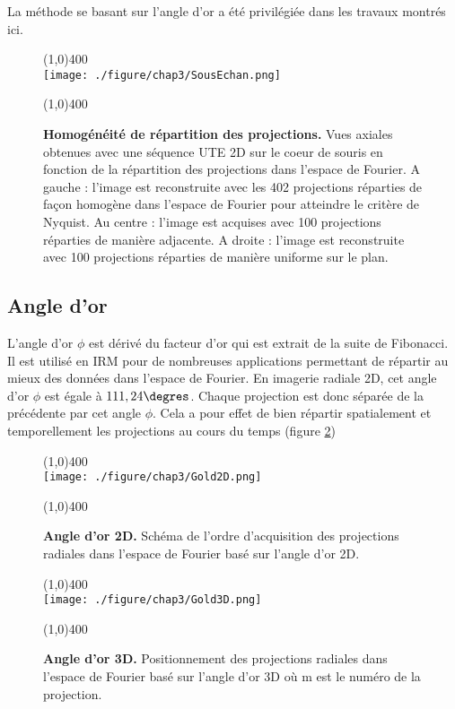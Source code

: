 La méthode se basant sur l’angle d’or a été privilégiée dans les travaux montrés ici.

\begin{figure}[H]
\centering
\line(1,0){400} \\
\texttt{[image: ./figure/chap3/SousEchan.png]}
\caption[Homogénéité de répartition des projections.]{\label{fig:SousEchan} \textbf{Homogénéité de répartition des projections.} Vues axiales obtenues avec une séquence UTE 2D sur le coeur de souris en fonction de la répartition des projections dans l'espace de Fourier. A gauche : l'image est reconstruite avec les 402 projections réparties de façon homogène dans l'espace de Fourier pour atteindre le critère de Nyquist. Au centre : l'image est acquises avec 100 projections réparties de manière adjacente. A droite : l'image est reconstruite avec 100 projections réparties de manière uniforme sur le plan.}
\line(1,0){400} \\ \end{figure}

\subsection{Angle d'or}

L'angle d'or $\phi$ est dérivé du facteur d'or qui est extrait de la suite de Fibonacci. Il est utilisé en IRM pour de nombreuses applications permettant de répartir au mieux des données dans l'espace de Fourier. En imagerie radiale 2D, cet angle d'or $\phi$ est égale à $111,24 \degres$. Chaque projection est donc séparée de la précédente par cet angle $\phi$. Cela a pour effet de bien répartir spatialement et temporellement les projections au cours du temps (figure \ref{fig:Gold2D})

\begin{figure}[H]
\centering \line(1,0){400} \\
\texttt{[image: ./figure/chap3/Gold2D.png]}
\caption[Angle d'or 2D.]{\label{fig:Gold2D} \textbf{Angle d'or 2D.} Schéma de l'ordre d'acquisition des projections radiales dans l'espace de Fourier basé sur l'angle d'or 2D.}
\line(1,0){400} \\ \end{figure}

\begin{figure}[H]
\centering \line(1,0){400} \\
\texttt{[image: ./figure/chap3/Gold3D.png]}
\caption[Angle d'or 3D.]{\label{fig:Gold3D} \textbf{Angle d'or 3D.} Positionnement des projections radiales dans l'espace de Fourier basé sur l'angle d'or 3D où m est le numéro de la projection.}
\line(1,0){400} \\ \end{figure}

